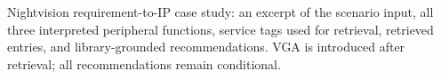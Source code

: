 \documentclass[10pt]{article}
\begin{document}

\par\smallskip
{\fontsize{8}{9.5}\selectfont
\raggedright\noindent
Nightvision requirement-to-IP case study: an excerpt of the scenario input,
all three interpreted peripheral functions, service tags used for retrieval,
retrieved entries, and library-grounded recommendations.
VGA is introduced after retrieval; all recommendations remain conditional.\par}
\end{document}
